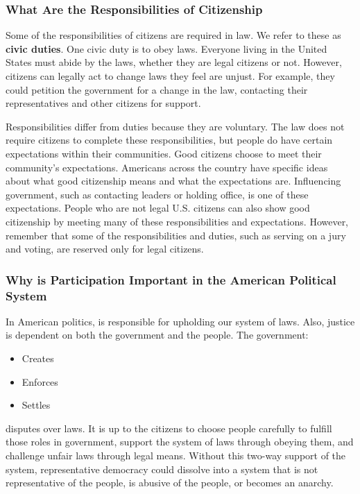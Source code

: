 
\subsubsection*{What Are the Responsibilities of Citizenship}

Some of the responsibilities of citizens are required in law. We refer to these
as \textbf{civic duties}. One civic duty is to obey laws. Everyone living in
the United States must abide by the laws, whether they are legal citizens or
not. However, citizens can legally act to change laws they feel are unjust. For
example, they could petition the government for a change in the law, contacting
their representatives and other citizens for support.

Responsibilities differ from duties because they are voluntary. The law does
not require citizens to complete these responsibilities, but people do have
certain expectations within their communities. Good citizens choose to meet
their community's expectations. Americans across the country have specific
ideas about what good citizenship means and what the expectations are.
Influencing government, such as contacting leaders or holding office, is one of
these expectations. People who are not legal U.S. citizens can also show good
citizenship by meeting many of these responsibilities and expectations.
However, remember that some of the responsibilities and duties, such as serving
on a jury and voting, are reserved only for legal citizens.

\subsubsection*{Why is Participation Important in the American Political System}

In American politics, is responsible for upholding our system of laws. Also,
justice is dependent on both the government and the people. The government:

\begin{itemize}
    \item Creates
    \item Enforces
    \item Settles
\end{itemize}

disputes over laws. It is up to the citizens to choose people carefully to
fulfill those roles in government, support the system of laws through obeying
them, and challenge unfair laws through legal means. Without this two-way
support of the system, representative democracy could dissolve into a system
that is not representative of the people, is abusive of the people, or becomes
an anarchy.

